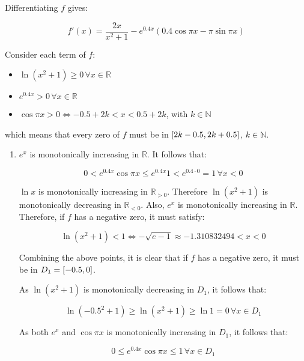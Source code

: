 \documentclass[../../../../Assignments]{subfiles}
\begin{document}
\begin{solution}
    Differentiating \(f\) gives:

    \[f'(x) = \frac{2x}{x^2 + 1} - e^{\num{0.4} x} (\num{0.4} \cos{\pi x} - \pi \sin{\pi x})\]

    Consider each term of \(f\):

    \begin{itemize}
        \item \(\ln(x^2 + 1) \geq 0 \, \forall x \in \mathbb{R}\)
        \item \(e^{\num{0.4} x} > 0 \, \forall x \in \mathbb{R}\)
        \item \(\cos{\pi x} > 0 \iff \num{-0.5} + 2k < x < \num{0.5} + 2k\), with \(k \in \mathbb{N}\)
    \end{itemize}

    \noindent which means that every zero of \(f\) must be in \(\interval{2k -
    \num{0.5}}{2k + \num{0.5}}\), \(k \in \mathbb{N}\).

    \begin{enumerate}[label = \alph*)]
        \item \(e^x\) is monotonically increasing in \(\mathbb{R}\). It follows
            that:

            \[0 < e^{\num{0.4} x} \cos{\pi x} \leq e^{\num{0.4} x} 1 < e^{\num{0.4} \cdot 0} = 1 \, \forall x < 0\]

            \(\ln{x}\) is monotonically increasing in \(\mathbb{R}_{> 0}\).
            Therefore \(\ln(x^2 + 1)\) is monotonically decreasing in
            \(\mathbb{R}_{< 0}\). Also, \(e^{x}\) is monotonically increasing in
            \(\mathbb{R}\). Therefore, if \(f\) has a negative zero, it must
            satisfy:

            \[\ln(x^2 + 1) < 1 \iff - \sqrt{e - 1} \approx \num{-1.310832494} < x < 0\]

            Combining the above points, it is clear that if \(f\) has a negative
            zero, it must be in \(D_1 = \interval{\num{-0.5}}{0}\).

            As \(\ln(x^2 + 1)\) is monotonically decreasing in \(D_1\), it
            follows that:

            \[\ln(\num{-0.5}^2 + 1) \geq \ln(x^2 + 1) \geq \ln{1} = 0 \, \forall x \in D_1\]

            As both \(e^x\) and \(\cos{\pi x}\) is monotonically increasing in
            \(D_1\), it follows that:

            \[0 \leq e^{\num{0.4} x} \cos{\pi x} \leq 1 \, \forall x \in D_1\]


\end{enumerate}
\end{solution}
\end{document}
